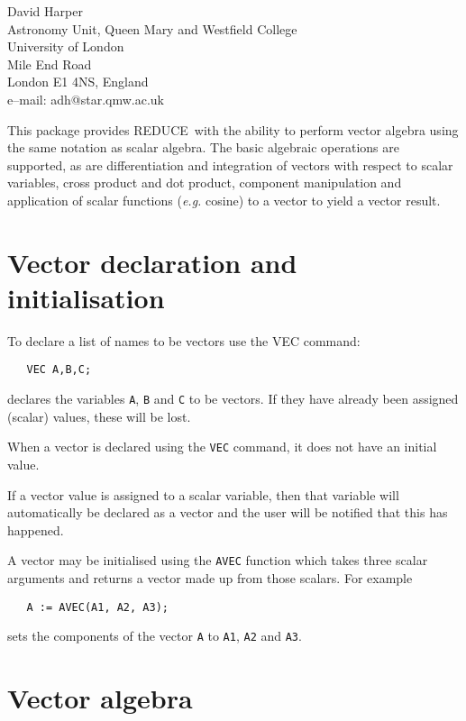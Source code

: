 \documentclass[11pt,letterpaper]{book}
\makeatletter
\newcommand{\REDUCE}{REDUCE}
\newcommand{\underscore}{\_}
\newcommand{\ttindex}[1]{{\renewcommand{\_}{\protect\underscore}%
                          \index{#1@{\tt #1}}}}
\makeatother
\begin{document}
{\footnotesize
\begin{center}
David Harper \\
Astronomy Unit, Queen Mary and Westfield College \\
University of London \\
Mile End Road \\
London E1 4NS, England \\[0.05in]
e--mail: adh@star.qmw.ac.uk
\end{center}
}
\ttindex{AVECTOR}

This package provides \REDUCE\ with the ability to perform vector
algebra using the same notation as scalar algebra.  The basic
algebraic operations are supported, as are differentiation and
integration of vectors with respect to scalar variables, cross product
and dot product, component manipulation and application of scalar
functions ({\em e.g.} cosine) to a vector to yield a vector result.

\section{Vector declaration and initialisation}

To declare a list of names to be vectors use the VEC command:
{\small\begin{verbatim}
   VEC A,B,C;
\end{verbatim}}
declares the variables {\tt A}, {\tt B} and {\tt C} to be vectors.
If they have already been assigned (scalar) values, these will be lost.

When a vector is declared using the {\tt VEC} command, it does not
have an initial value.

If a vector value is assigned to a scalar variable, then that
variable will automatically be declared as a vector and the
user will be notified that this has happened.

A vector may be initialised using the {\tt AVEC} function which
takes three scalar arguments and returns a vector made up
from those scalars. For example
{\small\begin{verbatim}
   A := AVEC(A1, A2, A3);
\end{verbatim}}
sets the components of the vector {\tt A} to {\tt A1}, {\tt A2} and
{\tt A3}.

\section{Vector algebra}
\end{document}
